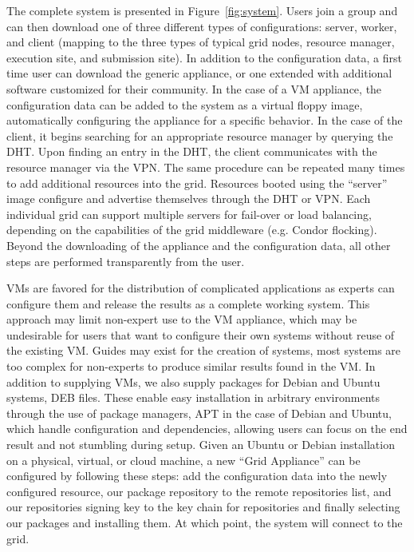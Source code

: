 \documentclass[conference]{IEEEtran}
\begin{document}
The complete system is presented in Figure~\ref{fig:system}.  Users join a
group and can then download one of three different types of configurations:
server, worker, and client (mapping to the three types of typical grid nodes,
resource manager, execution site, and submission site).  In addition to the
configuration data, a first time user can download the generic appliance, or
one extended with additional software customized for their community.  In the
case of a VM appliance, the configuration data can be added to the system as a
virtual floppy image, automatically configuring the appliance for a specific
behavior.  In the case of the client, it begins searching for an appropriate
resource manager by querying the DHT.  Upon finding an entry in the DHT, the
client communicates with the resource manager via the VPN.  The same procedure
can be repeated many times to add additional resources into the grid.
Resources booted using the ``server'' image configure and advertise themselves
through the DHT or VPN.  Each individual grid can support multiple servers for
fail-over or load balancing, depending on the capabilities of the grid
middleware (e.g. Condor flocking).  Beyond the downloading of the appliance and
the configuration data, all other steps are performed transparently from the
user.

VMs are favored for the distribution of complicated applications as experts can
configure them and release the results as a complete working system.  This
approach may limit non-expert use to the VM appliance, which may be undesirable
for users that want to configure their own systems without reuse of the
existing VM.  Guides may exist for the creation of systems, most systems are
too complex for non-experts to produce similar results found in the VM.  In
addition to supplying VMs, we also supply packages for Debian and Ubuntu
systems, DEB files.  These enable easy installation in arbitrary environments
through the use of package managers, APT in the case of Debian and Ubuntu,
which handle configuration and dependencies, allowing users can focus on the
end result and not stumbling during setup.  Given an Ubuntu or Debian
installation on a physical, virtual, or cloud machine, a new ``Grid Appliance''
can be configured by following these steps:  add the configuration data into
the newly configured resource, our package repository to the remote
repositories list, and our repositories signing key to the key chain for
repositories and finally selecting our packages and installing them.  At which
point, the system will connect to the grid.
\end{document}
